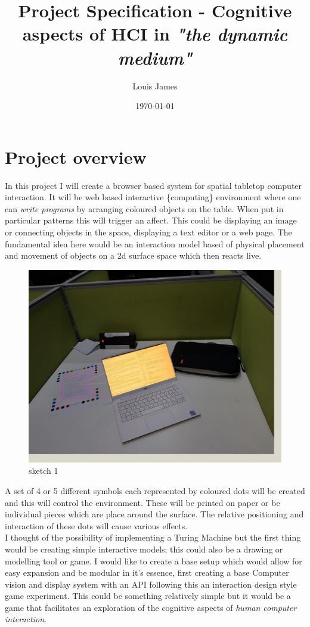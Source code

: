\documentclass[11pt]{article}
\author{Louis James}
\date{\today}
\title{Project Specification - Cognitive aspects of HCI in \emph{"the dynamic medium"}}
\begin{document}
\maketitle
\section*{Project overview}
\label{sec:org6a5c688}

In this project I will create a browser based system for spatial tabletop computer interaction. It will be web based interactive \{computing\} environment where one can \emph{write programs} by arranging coloured objects on the table. When put in particular patterns this will trigger an affect. This could be displaying an image or connecting objects in the space, displaying a text editor or a web page. The fundamental idea here would be an interaction model based of physical placement and movement of objects on a 2d surface space which then reacts live.\\

\begin{figure}[htbp]
\centering
\includegraphics[width=.9\linewidth]{setup.jpg}
\caption{sketch 1}
\end{figure}

A set of 4 or 5 different symbols each represented by coloured dots will be created and this will control the environment. These will be printed on paper or be individual pieces which are place around the surface. The relative positioning and interaction of these dots will cause various effects.\\

I thought of the possibility of implementing a Turing Machine but the first thing would be creating simple interactive models; this could also be a drawing or modelling tool or game. I would like to create a base setup which would allow for easy expansion and be modular in it's essence, first creating a base Computer vision and display system with an API following this an interaction design style game experiment. This could be something relatively simple but it would be a game that facilitates an exploration of the cognitive aspects of \emph{human computer interaction}.\\
\end{document}
